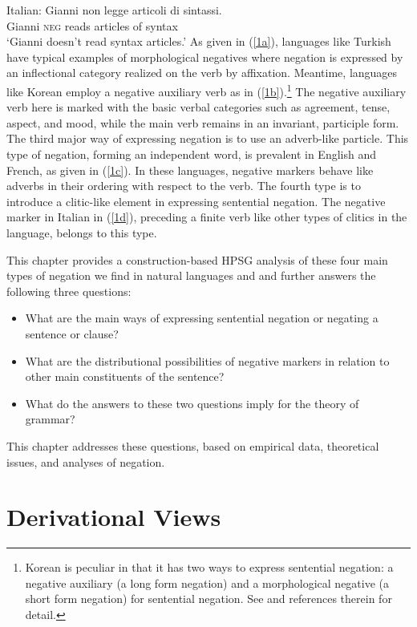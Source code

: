 \documentclass[output=paper]{langsci/langscibook}
\begin{document}
{\ex \label{1d} Italian:
\gll Gianni non legge articoli di sintassi. \\
Gianni \textsc{neg} reads articles of syntax \\
\glt `Gianni doesn't read syntax articles.'
\zl
%
As given in (\ref{1a}),
languages like Turkish
have typical examples of morphological negatives where
negation is expressed by an inflectional category realized on the
verb by affixation. Meantime, languages like Korean
 employ a negative auxiliary verb as in (\ref{1b}).\footnote{Korean
 is peculiar in that it has two ways to
 express sentential negation: a negative auxiliary (a long form
 negation)  and a morphological negative (a short form negation)
 for sentential negation. See \citet{Kim:00,Kim:16} and references therein for detail.}
  The negative auxiliary
 verb here is marked with the basic verbal categories such as agreement, tense, aspect, and mood, while the main verb remains in an invariant, participle form. The third major way of expressing negation is to use an adverb-like
particle. This type of negation, forming an independent word, is prevalent in English and French, as given in (\ref{1c}). In these languages, negative markers behave like adverbs in their ordering with respect to the verb. The fourth
type is to introduce a clitic-like element in
expressing sentential negation. The negative marker in Italian in (\ref{1d}), preceding a finite verb like other types of clitics in the language,
belongs to this type.

This chapter provides a construction-based HPSG analysis of these four main types of negation we find in natural languages  and and further answers the
following three questions:

\begin{itemize}
\item What are the main ways of expressing sentential
negation or negating a sentence or clause?

\item What are the distributional possibilities of
negative markers in
relation to other main constituents of the sentence?

\item What do the answers to these two questions imply for
the theory of grammar?
\end{itemize}

\noindent
This chapter addresses these questions, based on empirical data,
theoretical issues, and analyses of negation.

\section{Derivational Views}

}
\end{document}
